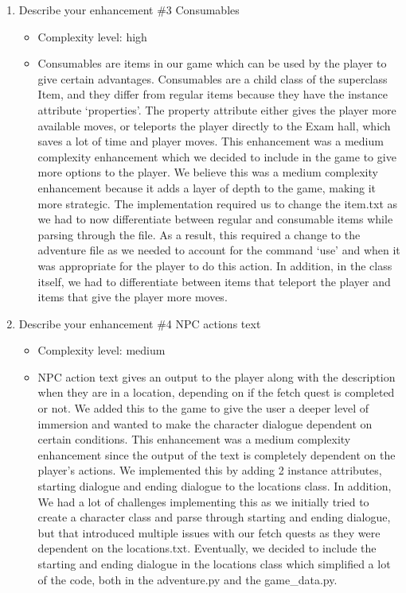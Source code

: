 \documentclass[11pt]{article}
\begin{document}
\begin{enumerate}
\item Describe your enhancement \#3 Consumables
	\begin{itemize}
	\item Complexity level: high
    \item Consumables are items in our game which can be used by the player to give certain advantages. Consumables are a child class of the superclass Item, and they differ from regular items because they have the instance attribute ‘properties’. The property attribute either gives the player more available moves, or teleports the player directly to the Exam hall, which saves a lot of time and player moves. This enhancement was a medium complexity enhancement which we decided to include in the game to give more options to the player. We believe this was a medium complexity enhancement because it adds a layer of depth to the game, making it more strategic. The implementation required us to change the item.txt as we had to now differentiate between regular and consumable items while parsing through the file. As a result, this required a change to the adventure file as we needed to account for the command ‘use’ and when it was appropriate for the player to do this action. In addition, in the class itself, we had to differentiate between items that teleport the player and items that give the player more moves.
	\end{itemize}

\item Describe your enhancement \#4 NPC actions text
        \begin{itemize}
        \item Complexity level: medium
    \item NPC action text gives an output to the player along with the description when they are in a location, depending on if the fetch quest is completed or not. We added this to the game to give the user a deeper level of immersion and wanted to make the character dialogue dependent on certain conditions. This enhancement was a medium complexity enhancement since the output of the text is completely dependent on the player's actions. We implemented this by adding 2 instance attributes, starting dialogue and ending dialogue to the locations class. In addition, We had a lot of challenges implementing this as we initially tried to create a character class and parse through starting and ending dialogue, but that introduced multiple issues with our fetch quests as they were dependent on the locations.txt. Eventually, we decided to include the starting and ending dialogue in the locations class which simplified a lot of the code, both in the adventure.py and the game\_data.py.
	\end{itemize}


\end{enumerate}
\end{document}
